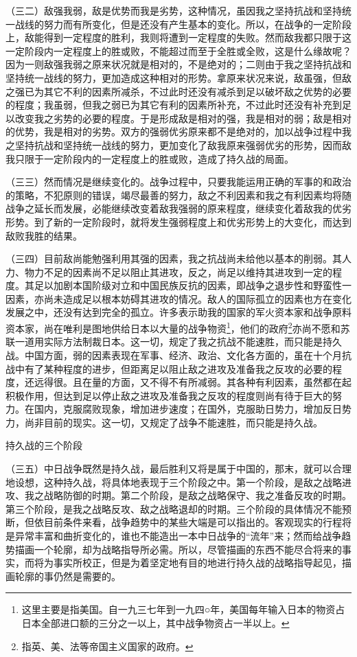 \documentclass[UTF8, 12pt, a4paper]{ctexrep}
\begin{document}
（三二）敌强我弱，敌是优势而我是劣势，这种情况，虽因我之坚持抗战和坚持统一战线的努力而有所变化，但是还没有产生基本的变化。所以，在战争的一定阶段上，敌能得到一定程度的胜利，我则将遭到一定程度的失败。然而敌我都只限于这一定阶段内一定程度上的胜或败，不能超过而至于全胜或全败，这是什么缘故呢？因为一则敌强我弱之原来状况就是相对的，不是绝对的；二则由于我之坚持抗战和坚持统一战线的努力，更加造成这种相对的形势。拿原来状况来说，敌虽强，但敌之强已为其它不利的因素所减杀，不过此时还没有减杀到足以破坏敌之优势的必要的程度；我虽弱，但我之弱已为其它有利的因素所补充，不过此时还没有补充到足以改变我之劣势的必要的程度。于是形成敌是相对的强，我是相对的弱；敌是相对的优势，我是相对的劣势。双方的强弱优劣原来都不是绝对的，加以战争过程中我之坚持抗战和坚持统一战线的努力，更加变化了敌我原来强弱优劣的形势，因而敌我只限于一定阶段内的一定程度上的胜或败，造成了持久战的局面。

（三三）然而情况是继续变化的。战争过程中，只要我能运用正确的军事的和政治的策略，不犯原则的错误，竭尽最善的努力，敌之不利因素和我之有利因素均将随战争之延长而发展，必能继续改变着敌我强弱的原来程度，继续变化着敌我的优劣形势。到了新的一定阶段时，就将发生强弱程度上和优劣形势上的大变化，而达到敌败我胜的结果。

（三四）目前敌尚能勉强利用其强的因素，我之抗战尚未给他以基本的削弱。其人力、物力不足的因素尚不足以阻止其进攻，反之，尚足以维持其进攻到一定的程度。其足以加剧本国阶级对立和中国民族反抗的因素，即战争之退步性和野蛮性一因素，亦尚未造成足以根本妨碍其进攻的情况。敌人的国际孤立的因素也方在变化发展之中，还没有达到完全的孤立。许多表示助我的国家的军火资本家和战争原料资本家，尚在唯利是图地供给日本以大量的战争物资\footnote{这里主要是指美国。自一九三七年到一九四○年，美国每年输入日本的物资占日本全部进口额的三分之一以上，其中战争物资占一半以上。}，他们的政府\footnote{指英、美、法等帝国主义国家的政府。}亦尚不愿和苏联一道用实际方法制裁日本。这一切，规定了我之抗战不能速胜，而只能是持久战。中国方面，弱的因素表现在军事、经济、政治、文化各方面的，虽在十个月抗战中有了某种程度的进步，但距离足以阻止敌之进攻及准备我之反攻的必要的程度，还远得很。且在量的方面，又不得不有所减弱。其各种有利因素，虽然都在起积极作用，但达到足以停止敌之进攻及准备我之反攻的程度则尚有待于巨大的努力。在国内，克服腐败现象，增加进步速度；在国外，克服助日势力，增加反日势力，尚非目前的现实。这一切，又规定了战争不能速胜，而只能是持久战。

持久战的三个阶段

（三五）中日战争既然是持久战，最后胜利又将是属于中国的，那末，就可以合理地设想，这种持久战，将具体地表现于三个阶段之中。第一个阶段，是敌之战略进攻、我之战略防御的时期。第二个阶段，是敌之战略保守、我之准备反攻的时期。第三个阶段，是我之战略反攻、敌之战略退却的时期。三个阶段的具体情况不能预断，但依目前条件来看，战争趋势中的某些大端是可以指出的。客观现实的行程将是异常丰富和曲折变化的，谁也不能造出一本中日战争的“流年”来；然而给战争趋势描画一个轮廓，却为战略指导所必需。所以，尽管描画的东西不能尽合将来的事实，而将为事实所校正，但是为着坚定地有目的地进行持久战的战略指导起见，描画轮廓的事仍然是需要的。
\end{document}
